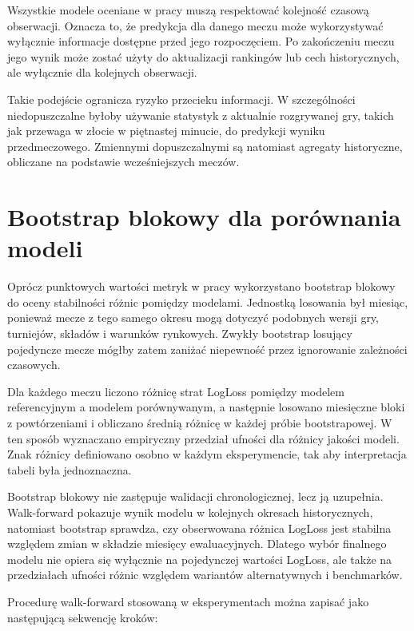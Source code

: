 Wszystkie modele oceniane w pracy muszą respektować kolejność czasową obserwacji. Oznacza to, że
predykcja dla danego meczu może wykorzystywać wyłącznie informacje dostępne przed jego rozpoczęciem.
Po zakończeniu meczu jego wynik może zostać użyty do aktualizacji rankingów lub cech historycznych,
ale wyłącznie dla kolejnych obserwacji.

Takie podejście ogranicza ryzyko przecieku informacji. W szczególności niedopuszczalne byłoby
używanie statystyk z aktualnie rozgrywanej gry, takich jak przewaga w złocie w piętnastej minucie,
do predykcji wyniku przedmeczowego. Zmiennymi dopuszczalnymi są natomiast agregaty historyczne,
obliczane na podstawie wcześniejszych meczów.

\section{Bootstrap blokowy dla porównania modeli}

Oprócz punktowych wartości metryk w pracy wykorzystano bootstrap blokowy do oceny stabilności różnic
pomiędzy modelami. Jednostką losowania był miesiąc, ponieważ mecze z tego samego okresu mogą
dotyczyć podobnych wersji gry, turniejów, składów i warunków rynkowych. Zwykły bootstrap losujący
pojedyncze mecze mógłby zatem zaniżać niepewność przez ignorowanie zależności czasowych.

Dla każdego meczu liczono różnicę strat LogLoss pomiędzy modelem referencyjnym a modelem
porównywanym, a następnie losowano miesięczne bloki z powtórzeniami i obliczano średnią różnicę w
każdej próbie bootstrapowej. W ten sposób wyznaczano empiryczny przedział ufności dla różnicy
jakości modeli. Znak różnicy definiowano osobno w każdym eksperymencie, tak aby interpretacja tabeli
była jednoznaczna.

Bootstrap blokowy nie zastępuje walidacji chronologicznej, lecz ją uzupełnia. Walk-forward pokazuje
wynik modelu w kolejnych okresach historycznych, natomiast bootstrap sprawdza, czy obserwowana
różnica LogLoss jest stabilna względem zmian w składzie miesięcy ewaluacyjnych. Dlatego wybór
finalnego modelu nie opiera się wyłącznie na pojedynczej wartości LogLoss, ale także na przedziałach
ufności różnic względem wariantów alternatywnych i benchmarków.

Procedurę walk-forward stosowaną w eksperymentach można zapisać jako następującą sekwencję kroków:

